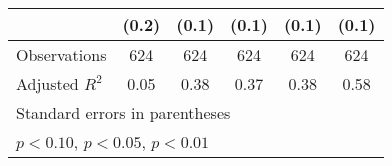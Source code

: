 \begin{table}[htbp]
\begin{tabular}{l*{5}{c}}
                &    (0.2)         &    (0.1)         &    (0.1)         &    (0.1)         &    (0.1)         \\
\hline
Observations    &      624         &      624         &      624         &      624         &      624         \\
Adjusted \(R^{2}\)&     0.05         &     0.38         &     0.37         &     0.38         &     0.58         \\
\hline\hline
\multicolumn{6}{l}{\footnotesize Standard errors in parentheses}\\
\multicolumn{6}{l}{\footnotesize \sym{*} \(p<0.10\), \sym{**} \(p<0.05\), \sym{***} \(p<0.01\)}\\
\end{tabular}
\end{table}
